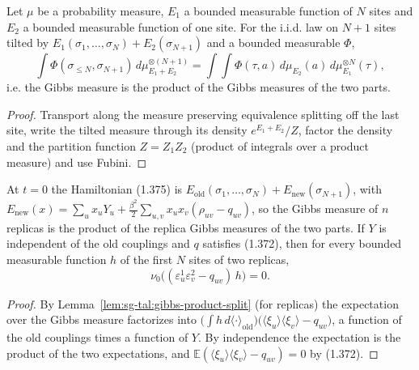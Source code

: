 \begin{lemma}\label{lem:sg-tal:gibbs-product-split}
\leanok
{}
Let $\mu$ be a probability measure, $E_1$ a bounded measurable function of $N$ sites and $E_2$ a bounded measurable function of one site. For the i.i.d. law on $N+1$ sites tilted by $E_1(\sigma_1,\dots,\sigma_N)+E_2(\sigma_{N+1})$ and a bounded measurable $\Phi$,
\[
\int\Phi(\sigma_{\le N},\sigma_{N+1})\,d\mu^{\otimes(N+1)}_{E_1+E_2}=\int\!\!\int\Phi(\tau,a)\,d\mu_{E_2}(a)\,d\mu^{\otimes N}_{E_1}(\tau),
\]
i.e. the Gibbs measure is the product of the Gibbs measures of the two parts.
\end{lemma}
\begin{proof}
\leanok
Transport along the measure preserving equivalence splitting off the last site, write the tilted measure through its density $e^{E_1+E_2}/Z$, factor the density and the partition function $Z=Z_1Z_2$ (product of integrals over a product measure) and use Fubini.
\end{proof}

\begin{theorem}[The decoupled system at $t=0$]\label{thm:sg-tal:vector-decoupled}
\leanok
{}
At $t=0$ the Hamiltonian (1.375) is $E_{\mathrm{old}}(\sigma_1,\dots,\sigma_N)+E_{\mathrm{new}}(\sigma_{N+1})$, with $E_{\mathrm{new}}(x)=\sum_ux_uY_u+\frac{\beta^2}2\sum_{u,v}x_ux_v(\rho_{uv}-q_{uv})$, so the Gibbs measure of $n$ replicas is the product of the replica Gibbs measures of the two parts. If $Y$ is independent of the old couplings and $q$ satisfies (1.372), then for every bounded measurable function $h$ of the first $N$ sites of two replicas,
\[
\nu_0\bigl((\varepsilon^1_u\varepsilon^2_v-q_{uv})\,h\bigr)=0 .
\]
\end{theorem}
\begin{proof}
\leanok
By Lemma~\ref{lem:sg-tal:gibbs-product-split} (for replicas) the expectation over the Gibbs measure factorizes into $\bigl(\int h\,d\langle\cdot\rangle_{\mathrm{old}}\bigr)\bigl(\langle\xi_u\rangle\langle\xi_v\rangle-q_{uv}\bigr)$, a function of the old couplings times a function of $Y$. By independence the expectation is the product of the two expectations, and $\mathbb E(\langle\xi_u\rangle\langle\xi_v\rangle-q_{uv})=0$ by (1.372).
\end{proof}

